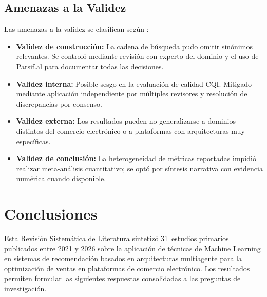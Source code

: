 \documentclass[12pt, a4paper]{article}
\newcommand{\RSL}{Revisi\'on Sistem\'atica de Literatura}
\begin{document}
\subsection{Amenazas a la Validez}

Las amenazas a la validez se clasifican seg\'un \cite{Wohlin2012}:

\begin{itemize}
  \item \textbf{Validez de construcci\'on:} La cadena de b\'usqueda pudo
        omitir sin\'onimos relevantes. Se control\'o mediante revisi\'on con
        experto del dominio y el uso de Parsif.al para documentar todas las
        decisiones.
  \item \textbf{Validez interna:} Posible sesgo en la evaluaci\'on de calidad
        CQI. Mitigado mediante aplicaci\'on independiente por m\'ultiples
        revisores y resoluci\'on de discrepancias por consenso.
  \item \textbf{Validez externa:} Los resultados pueden no generalizarse a
        dominios distintos del comercio electr\'onico o a plataformas con
        arquitecturas muy espec\'ificas.
  \item \textbf{Validez de conclusi\'on:} La heterogeneidad de m\'etricas
        reportadas impidi\'o realizar meta-an\'alisis cuantitativo; se opt\'o
        por s\'intesis narrativa con evidencia num\'erica cuando disponible.
\end{itemize}

\section{Conclusiones}

Esta \RSL{} sintetiz\'o 31~estudios primarios publicados entre 2021 y 2026 sobre
la aplicaci\'on de t\'ecnicas de Machine Learning en sistemas de recomendaci\'on
basados en arquitecturas multiagente para la optimizaci\'on de ventas en
plataformas de comercio electr\'onico. Los resultados permiten formular las
siguientes respuestas consolidadas a las preguntas de investigaci\'on.
\end{document}
